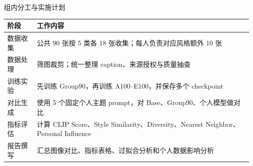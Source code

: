 \documentclass[aspectratio=169,11pt]{ctexbeamer}
\begin{document}
\begin{frame}{组内分工与实施计划}
  \small
  \begin{tabularx}{\textwidth}{l X}
    \toprule
    阶段 & 工作内容 \\
    \midrule
    数据收集 & 公共 90 张按 5 类各 18 张收集；每人负责对应风格额外 10 张 \\
    数据处理 & 筛图裁剪；统一整理 caption、来源授权与质量抽查 \\
    训练实验 & 先训练 Group90，再训练 A100--E100，并保存多个 checkpoint \\
    对比生成 & 使用 5 个固定个人主题 prompt，对 Base、Group90、个人模型做对比 \\
    指标评估 & 计算 CLIP Score、Style Similarity、Diversity、Nearest Neighbor、Personal Influence \\
    报告撰写 & 汇总图像对比、指标表格、过拟合分析和个人数据影响分析 \\
    \bottomrule
  \end{tabularx}
\end{frame}
\end{document}
